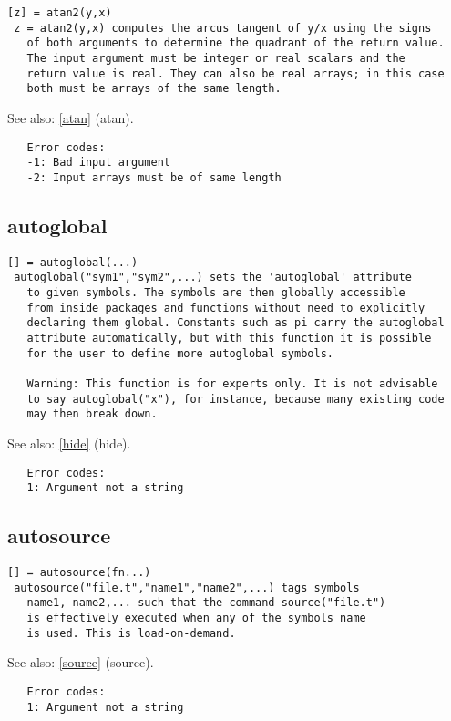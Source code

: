 \documentclass[a4paper]{article}
\begin{document}
\begin{tscreen}
\begin{verbatim}
[z] = atan2(y,x)
 z = atan2(y,x) computes the arcus tangent of y/x using the signs
   of both arguments to determine the quadrant of the return value.
   The input argument must be integer or real scalars and the
   return value is real. They can also be real arrays; in this case
   both must be arrays of the same length.
\end{verbatim}

See also: \ref{atan} {(atan)}.
\begin{verbatim}
   Error codes:
   -1: Bad input argument
   -2: Input arrays must be of same length
\end{verbatim}
\end{tscreen}



\subsection{autoglobal\label{autoglobal}}

\begin{tscreen}
\begin{verbatim}
[] = autoglobal(...)
 autoglobal("sym1","sym2",...) sets the 'autoglobal' attribute
   to given symbols. The symbols are then globally accessible
   from inside packages and functions without need to explicitly
   declaring them global. Constants such as pi carry the autoglobal
   attribute automatically, but with this function it is possible
   for the user to define more autoglobal symbols.

   Warning: This function is for experts only. It is not advisable
   to say autoglobal("x"), for instance, because many existing code
   may then break down.
\end{verbatim}

See also: \ref{hide} {(hide)}.
\begin{verbatim}
   Error codes:
   1: Argument not a string 
\end{verbatim}
\end{tscreen}



\subsection{autosource\label{autosource}}

\begin{tscreen}
\begin{verbatim}
[] = autosource(fn...)
 autosource("file.t","name1","name2",...) tags symbols
   name1, name2,... such that the command source("file.t")
   is effectively executed when any of the symbols name
   is used. This is load-on-demand.
\end{verbatim}

See also: \ref{source} {(source)}.
\begin{verbatim}
   Error codes:
   1: Argument not a string 
\end{verbatim}
\end{tscreen}
\end{document}
